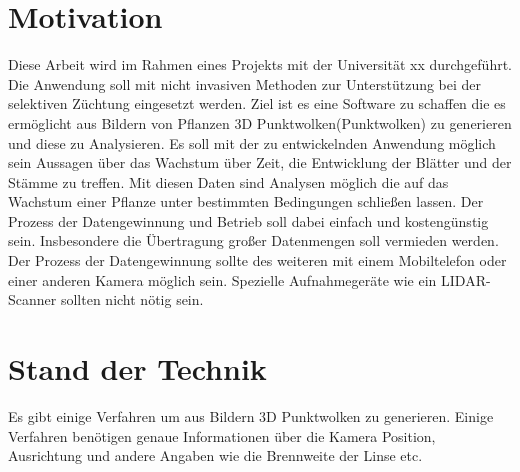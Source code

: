 \documentclass[12pt,titlepage,twoside]{article}
\begin{document}
\section{Motivation}
\label{sec:einleitung}
Diese Arbeit wird im Rahmen eines Projekts mit der Universität xx durchgeführt. Die Anwendung soll mit nicht invasiven Methoden zur Unterstützung bei der selektiven Züchtung eingesetzt werden.
Ziel ist es eine Software zu schaffen die es ermöglicht aus Bildern von Pflanzen 3D Punktwolken(Punktwolken) zu generieren und diese zu Analysieren.
Es soll mit der zu entwickelnden Anwendung möglich sein Aussagen über das Wachstum über Zeit, die Entwicklung der Blätter und der Stämme zu treffen. 
Mit diesen Daten sind Analysen möglich die auf das Wachstum einer Pflanze unter bestimmten Bedingungen schließen lassen.
Der Prozess der Datengewinnung und Betrieb soll dabei einfach und kostengünstig sein. Insbesondere die Übertragung großer Datenmengen soll vermieden werden.
Der Prozess der Datengewinnung sollte des weiteren mit einem Mobiltelefon oder einer anderen Kamera möglich sein. Spezielle Aufnahmegeräte wie ein LIDAR-Scanner sollten nicht nötig sein.


\newpage
\section{Stand der Technik}
\label{sec:stand}
%

Es gibt einige Verfahren um aus Bildern 3D Punktwolken zu generieren. Einige Verfahren benötigen genaue Informationen über die Kamera Position, Ausrichtung und andere Angaben wie die Brennweite der Linse etc.  
\end{document}
